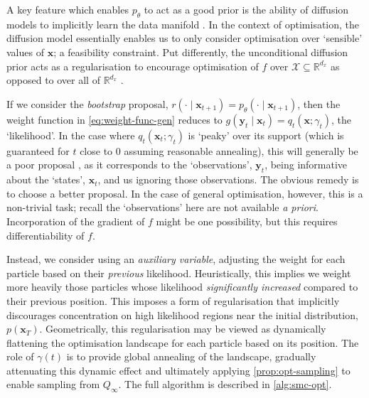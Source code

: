 \begin{remark}
    A key feature which enables $p_\theta$ to act as a good prior is the ability of diffusion models
    to implicitly learn the data manifold \parencite{debortoliDiffusionSchrOdinger2021,pidstrigachScoreBasedGenerativeModels2022,wenliangScorebasedGenerativeModels2023}.
    In the context of optimisation, the diffusion model essentially enables us to only consider
    optimisation over `sensible' values of $\mathbf{x}$; a feasibility constraint. Put differently,
    the unconditional diffusion prior acts as a regularisation to encourage optimisation of $f$ over
    $\mathcal{X} \subseteq \mathbb{R}^{d_x}$ as opposed to over all of $\mathbb{R}^{d_x}$
    \parencite{guoGradientGuidanceDiffusion2024}.
\end{remark}

If we consider the \emph{bootstrap} proposal,
$r(\cdot \mid \mathbf{x}_{t+1}) = p_\theta(\cdot \mid \mathbf{x}_{t+1})$, then the
weight function in \autoref{eq:weight-func-gen} reduces to
$g(\mathbf{y}_t \mid \mathbf{x}_t) = q_t(\mathbf{x}; \gamma_t)$, the `likelihood'. In the case where
$q_t(\mathbf{x}_t; \gamma_t)$ is `peaky' over its support (which is guaranteed for $t$ close to 0
assuming reasonable annealing), this will generally be a poor proposal
\parencite{chopinIntroductionSequentialMonte2020}, as it corresponds to the `observations',
$\mathbf{y}_t$, being informative about the `states', $\mathbf{x}_t$, and us ignoring those
observations. The obvious remedy is to choose a better proposal. In the case of general
optimisation, however, this is a non-trivial task; recall the `observations' here are not available
\emph{a priori}. Incorporation of the gradient of $f$ might be one possibility, but this requires
differentiability of $f$.

Instead, we consider using an \emph{auxiliary variable}, adjusting the weight
for each particle based on their \emph{previous} likelihood. Heuristically, this implies we weight
more heavily those particles whose likelihood \emph{significantly increased} compared to their
previous position. This imposes a form of regularisation that implicitly discourages concentration on
high likelihood regions near the initial distribution, $p(\mathbf{x}_T)$. Geometrically, this
regularisation may be viewed as dynamically flattening the optimisation landscape for each particle
based on its position. The role of $\gamma(t)$ is to provide global annealing of the landscape,
gradually attenuating this dynamic effect and ultimately applying \autoref{prop:opt-sampling} to
enable sampling from $Q_\infty$. The full algorithm is described in \autoref{alg:smc-opt}.

